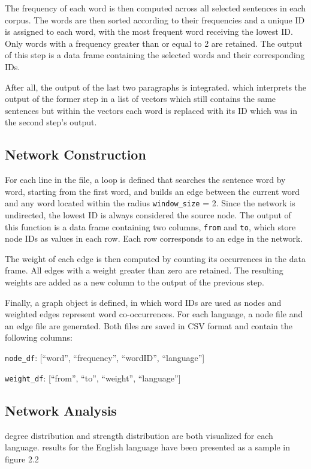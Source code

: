 \noindent
The frequency of each word is then computed across all selected sentences in each corpus. The words are then sorted according to their frequencies and a unique ID is assigned to each word, with the most frequent word receiving the lowest ID. Only words with a frequency greater than or equal to 2 are retained. The output of this step is a data frame containing the selected words and their corresponding IDs.

\noindent
After all, the output of the last two paragraphs is integrated. which interprets the output of the former step in a list of vectors which still contains the same sentences but within the vectors each word is replaced with its ID which was in the second step’s output.

\subsection{Network Construction}
For each line in the file, a loop is defined that searches the sentence word by word, starting from the first word, and builds an edge between the current word and any word located within the radius \texttt{window\_size} = 2. Since the network is undirected, the lowest ID is always considered the source node. The output of this function is a data frame containing two columns, \texttt{from} and \texttt{to}, which store node IDs as values in each row. Each row corresponds to an edge in the network.

\noindent
The weight of each edge is then computed by counting its occurrences in the data frame. All edges with a weight greater than zero are retained. The resulting weights are added as a new column to the output of the previous step.

\noindent
Finally, a graph object is defined, in which word IDs are used as nodes and weighted edges represent word co-occurrences.
For each language, a node file and an edge file are generated. Both files are saved in CSV format and contain the following columns:

\texttt{node\_df}: [``word'', ``frequency'', ``wordID'', ``language'']

\texttt{weight\_df}: [``from'', ``to'', ``weight'', ``language'']

\subsection{Network Analysis}

degree distribution and strength distribution are both visualized for each language. results for the English language have been presented as a sample in figure 2.2


